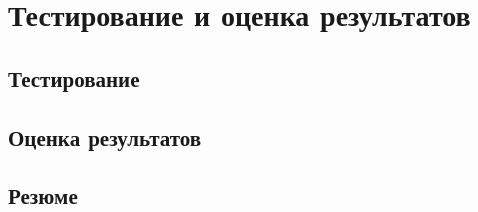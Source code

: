 \chapter{Тестирование и оценка результатов}\label{ch:тестирование-и-оценка-результатов}


\section{Тестирование}\label{sec:тестирование-}



\section{Оценка результатов}\label{sec:оценка-результатов}



\section{Резюме}\label{sec:резюме-тестирование}


